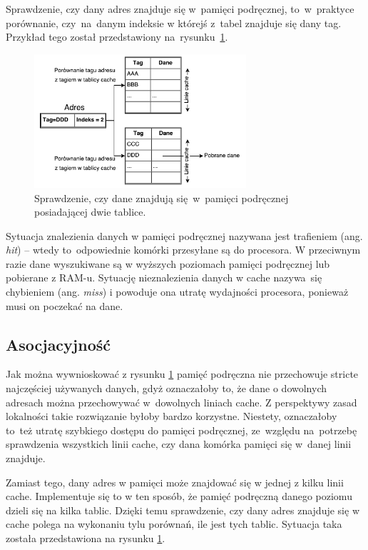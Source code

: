 Sprawdzenie, czy dany adres znajduje się w~pamięci podręcznej, to~w~praktyce porównanie, czy~na~danym indeksie w którejś z~tabel znajduje się dany tag. Przykład tego został przedstawiony na~rysunku~\ref{fig:cacheFetch}.

\begin{figure}[!h]
	\centering
	\includegraphics[width=0.7\textwidth]{images/cache_fetch}
	\caption{Sprawdzenie, czy dane znajdują się~w~pamięci podręcznej posiadającej dwie tablice.}
    \label{fig:cacheFetch}
\end{figure}

Sytuacja znalezienia danych w pamięci podręcznej nazywana jest trafieniem (ang. \textit{hit}) -- wtedy to~odpowiednie komórki przesyłane są do procesora. W przeciwnym razie dane wyszukiwane są w wyższych poziomach pamięci podręcznej lub pobierane z RAM-u. Sytuację nieznalezienia danych w cache nazywa~się chybieniem (ang. \textit{miss}) i powoduje ona utratę wydajności procesora, ponieważ musi on poczekać na dane.

\subsection{Asocjacyjność}
\label{cha:Associativity}

Jak można wywnioskować z rysunku \ref{fig:cacheFetch} pamięć podręczna nie przechowuje stricte najczęściej używanych danych, gdyż oznaczałoby to, że dane o dowolnych adresach można przechowywać w~dowolnych liniach cache. Z perspektywy zasad lokalności takie rozwiązanie byłoby bardzo korzystne. Niestety, oznaczałoby to~też utratę szybkiego dostępu do pamięci podręcznej, ze~względu na~potrzebę sprawdzenia wszystkich linii cache, czy dana komórka pamięci się w~danej linii znajduje.

Zamiast tego, dany adres w pamięci może znajdować się w jednej z kilku linii cache. Implementuje się to w ten sposób, że pamięć podręczną danego poziomu dzieli się na kilka tablic. Dzięki temu sprawdzenie, czy dany adres znajduje się w cache polega na wykonaniu tylu porównań, ile jest tych tablic. Sytuacja taka została przedstawiona na rysunku \ref{fig:cacheFetch}.

